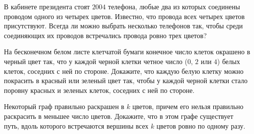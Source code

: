 \begin{exersize}
	В кабинете президента стоят $2004$ телефона, любые два из которых соединены проводом одного из четырех цветов. Известно, что провода всех четырех цветов присутствуют. Всегда ли можно выбрать несколько телефонов так, чтобы среди соединяющих их проводов встречались провода ровно трех цветов?
\end{exersize}	 

\begin{exersize}
	На бесконечном белом листе клетчатой бумаги конечное число клеток окрашено в черный цвет так, что у каждой черной клетки четное число ($0$, $2$ или $4$) белых клеток, соседних с ней по стороне. Докажите, что каждую белую клетку можно покрасить в красный или зеленый цвет так, чтобы у каждой черной клетки стало поровну красных и зеленых клеток, соседних с ней по стороне.
\end{exersize}	 	 

\begin{exersize}
	Некоторый граф правильно раскрашен в $k$ цветов, причем его нельзя правильно раскрасить в меньшее число цветов. Докажите, что в этом графе существует путь, вдоль которого встречаются вершины всех $k$ цветов ровно по одному разу.
\end{exersize}	
